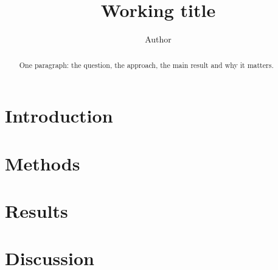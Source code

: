 \documentclass[11pt]{article}
\title{Working title}
\author{Author}
\begin{document}
\maketitle

\begin{abstract}
One paragraph: the question, the approach, the main result and why it matters.
\end{abstract}

\section{Introduction}
\section{Methods}
\section{Results}
\section{Discussion}



\end{document}
